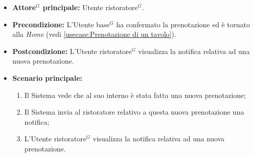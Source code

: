 \label{usecase:Visualizzazione notifica nuova prenotazione}
\begin{itemize}
	\item \textbf{\gls{Attore}$^G$ principale:} \gls{Utente ristoratore}$^G$.
	
	\item \textbf{Precondizione:} L'\gls{Utente base}$^G$ ha confermato la prenotazione ed è tornato alla \textit{Home} (vedi \autoref{usecase:Prenotazione di un tavolo}).

	\item \textbf{Postcondizione:} L'\gls{Utente ristoratore}$^G$ visualizza la notifica relativa ad una nuova prenotazione.
     
	\item \textbf{Scenario principale:}
	      \begin{enumerate}
                \item Il Sistema vede che al suo interno è stata fatta una nuova prenotazione;
                \item Il Sistema invia al ristoratore relativo a questa nuova prenotazione una notifica;
                \item L'\gls{Utente ristoratore}$^G$ visualizza la notifica relativa ad una nuova prenotazione.
	      \end{enumerate}
\end{itemize}